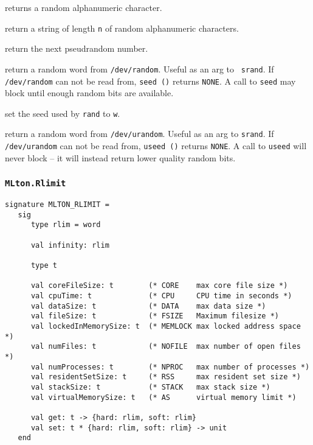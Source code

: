 \begin{description}
returns a random alphanumeric character.

return a string of length {\tt n} of random alphanumeric characters.

return the next pseudrandom number.

return a random word from {\tt /dev/random}.  Useful as an arg to {\tt
srand}.  If {\tt /dev/random} can not be read from, {\tt seed ()}
returns {\tt NONE}.  A call to {\tt seed} may block until enough
random bits are available.

set the seed used by {\tt rand} to {\tt w}.

return a random word from {\tt /dev/urandom}.  Useful as an arg to
{\tt srand}.  If {\tt /dev/urandom} can not be read from, {\tt useed
()} returns {\tt NONE}.  A call to {\tt useed} will never block -- it
will instead return lower quality random bits.

\end{description}
%
\subsubsection{\tt MLton.Rlimit}

\begin{verbatim}
signature MLTON_RLIMIT =
   sig
      type rlim = word
               
      val infinity: rlim

      type t
               
      val coreFileSize: t        (* CORE    max core file size *)
      val cpuTime: t             (* CPU     CPU time in seconds *)
      val dataSize: t            (* DATA    max data size *)
      val fileSize: t            (* FSIZE   Maximum filesize *)
      val lockedInMemorySize: t  (* MEMLOCK max locked address space *)
      val numFiles: t            (* NOFILE  max number of open files *)  
      val numProcesses: t        (* NPROC   max number of processes *)
      val residentSetSize: t     (* RSS     max resident set size *)
      val stackSize: t           (* STACK   max stack size *)
      val virtualMemorySize: t   (* AS      virtual memory limit *)
      
      val get: t -> {hard: rlim, soft: rlim}
      val set: t * {hard: rlim, soft: rlim} -> unit
   end
\end{verbatim}

